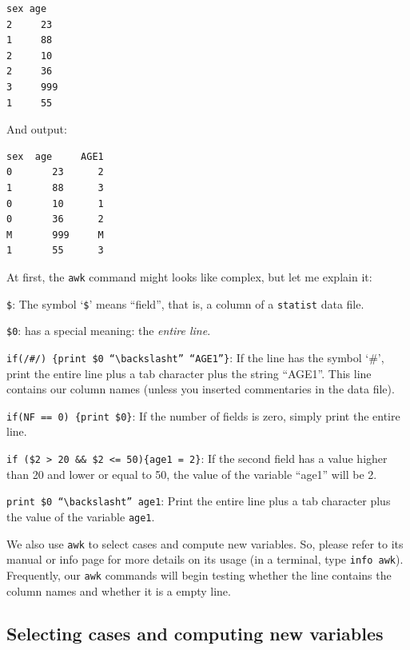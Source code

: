 \documentclass[12pt,english]{article}
\newcommand{\st}{{\tt sta\-tist} }
\begin{document}
\begin{verbatim}
sex age
2     23
1     88
2     10
2     36
3     999
1     55
\end{verbatim}

And output:

\begin{verbatim}
sex  age     AGE1
0       23      2
1       88      3
0       10      1
0       36      2
M       999     M
1       55      3
\end{verbatim}

At first, the {\tt awk} command might looks like complex,
but let me explain it: 

\begin{description}

\item {\tt \$}: The symbol  `{\tt \$}' means ``field'', that
is, a column of a \st data file.

\item {\tt \$0}: has a special meaning: the {\em entire
line}.

\item {\tt if(/\#/) \{print \$0 ``$\backslash$t''
``AGE1''\}}: If the line has the symbol `\#', print the
entire line plus a tab character plus the string ``AGE1''.
This line contains our column names (unless you inserted
commentaries in the data file).

\item {\tt if(NF == 0) \{print \$0\}}: If the number of
fields is zero, simply print the entire line.

\item {\tt if (\$2 > 20 \&\& \$2 <= 50)\{age1 = 2\}}: If the
second field has a value higher than 20 and lower or equal
to 50, the value of the variable ``age1'' will be 2.

\item {\tt print \$0 ``$\backslash$t'' age1}: Print the
entire line plus a tab character plus the value of the
variable {\tt age1}.

\end{description}

We also use {\tt awk} to select cases and compute new
variables. So, please refer to its manual or info page for
more details on its usage (in a terminal, type {\tt info
awk}). Frequently, our {\tt awk} commands will begin testing
whether the line contains the column names and whether it is
a empty line.

\subsection{Selecting cases and computing new variables}
\end{document}
